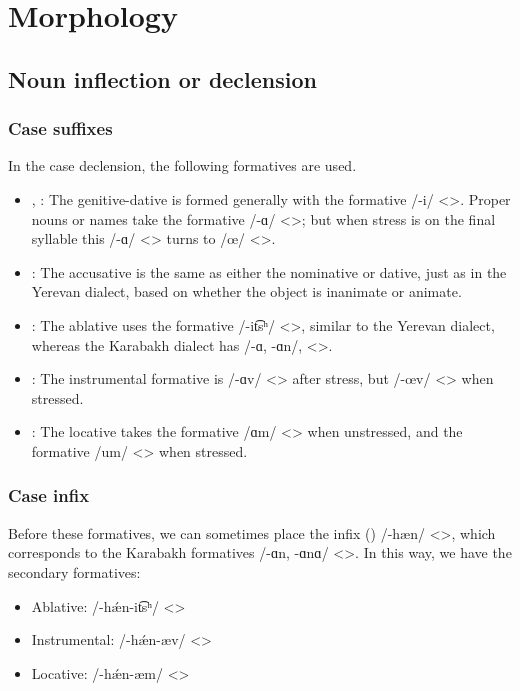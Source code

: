\section{Morphology}

\subsection{Noun inflection or declension}

\subsubsection{Case suffixes}
In the case declension, the following formatives are used. 
\begin{itemize}
	\item {\gen}, {\dat}: The genitive-dative is formed generally with the formative /-i/ <>. Proper nouns or names take the formative /-ɑ/ <>; but when stress is on the final syllable this /-ɑ/ <> turns to /œ/ <>. 
	\item {\acc}: The accusative is the same as either the nominative or dative, just as in the Yerevan dialect, based on whether the object is inanimate or animate.
	\item {\abl}: The ablative uses the formative /-it͡sʰ/ <>, similar to the Yerevan dialect, whereas the Karabakh dialect has /-ɑ, -ɑn/, <>. 
	\item {\ins}: The instrumental formative is /-ɑv/ <> after stress, but /-œv/ <> when stressed. 
	\item {\locgloss}: The locative takes the   formative  /ɑm/ <> when unstressed, and the formative /um/ <> when stressed. 
	
 
\end{itemize}

\subsubsection{Case infix}
Before these formatives, we can sometimes place the infix () /-hæn/ <>, which corresponds to the Karabakh formatives /-ɑn, -ɑnɑ/ <>. In this way, we have the secondary formatives:\begin{itemize}
	\item Ablative: /-h\'æn-it͡sʰ/ <>
	\item Instrumental: /-h\'æn-æv/ <>
	\item Locative: /-h\'æn-æm/ <>
\end{itemize} 

